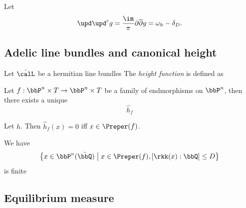 \begin{proposition}
\end{proposition}

\begin{theorem}
	Let
	\[ \upd \upd^c g = \frac{\im}{\pi} \partial \overline{\partial} g = \omega_h - \delta_D. \]
	\Yang{}
\end{theorem}



\subsection[status=draft,tag=0000000,label=\labelNFM{subsec:on-complex-dynamics}]{Adelic line bundles and canonical height}

\begin{definition}[label=\labelNFM{def:height-function-by-metrized-line-bundle}, status=draft, tag=0000000]
	Let $\bar{\calL}$ be a hermitian line bundles
	The \emph{height function} is defined as
	\Yang{}
\end{definition}

\begin{proposition}[label=\labelNFM{prop:canonical-height-for-family-of-endomorphism-on-pn}, status=draft, tag=0000000]
	Let $f: \bbP^n \times T \to \bbP^n \times T$ be a family of endmorphisms on $\bbP^n$, then there exists a unique
	\[ \hat{h}_f \]
	\Yang{}
\end{proposition}

\begin{corollary}[label=\labelNFM{cor:zero-of-canonical-height-was-preperiodic-points}, status=draft, tag=0000000]
	Let $h$.
	Then $\hat{h}_f(x) = 0$ iff $x \in \Preper(f)$.
\end{corollary}

\begin{corollary}[label=\labelNFM{cor:finiteness-of-preperiodic-points-of-finite-degree-defined-field}, status=draft, tag=0000000]
	We have
	\[ \left\{ x \in \bbP^n(\bar{\bbQ}) \;\middle|\; x \in \Preper(f), [\rkk(x): \bbQ] \leq D \right\} \]
	is finite \Yang{}
\end{corollary}



\subsection[status=draft,tag=0000000,label=\labelNFM{subsec:equilibrium-measure-and-julia-sets}]{Equilibrium measure}


